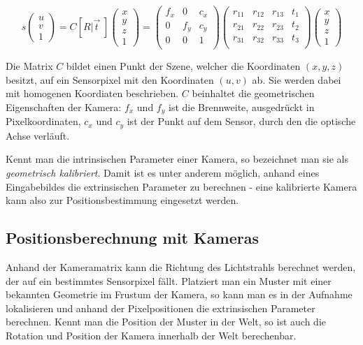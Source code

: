    \begin{equation}
     s \begin{pmatrix}  u \\ v \\ 1 \end{pmatrix} =  C[R|\vec{t}\;]	 
     \begin{pmatrix}  x \\ y \\ z \\ 1  \end{pmatrix} = 
     \begin{pmatrix}  
         f_x & 0 & c_x \\ 
         0  & f_y & c_y \\ 
         0  & 0 & 1 \\ 
     \end{pmatrix}
     \begin{pmatrix}  
         r_{11} & r_{12} & r_{13} & t_1 \\ 
         r_{21} & r_{22} & r_{23} & t_2 \\ 
         r_{31} & r_{32} & r_{33} & t_3 \\ 
     \end{pmatrix}
     \begin{pmatrix}  x \\ y \\ z \\ 1  \end{pmatrix}
     \label{eq:pinhole}
   \end{equation}

   Die Matrix $C$ bildet einen Punkt der Szene, welcher die Koordinaten $(x,y,z)$ besitzt, auf ein Sensorpixel mit den Koordinaten $(u,v)$ ab. Sie werden dabei mit homogenen Koordiaten beschrieben.
   $C$ beinhaltet die geometrischen Eigenschaften der Kamera: $f_x$ und $f_y$ ist die Brennweite, ausgedrückt in Pixelkoordinaten, $c_x$ und $c_y$ ist der Punkt auf dem Sensor, durch den die optische Achse verläuft.
   
   Kennt man die intrinsischen Parameter einer Kamera, so bezeichnet man sie als \emph{geometrisch kalibriert}. 
   Damit ist es unter anderem möglich, anhand eines Eingabebildes die extrinsischen Parameter zu berechnen - eine kalibrierte Kamera kann also zur Positionsbestimmung eingesetzt werden.
   
 \subsection{Positionsberechnung mit Kameras} \label{pos_kameras}
   Anhand der Kameramatrix kann die Richtung des Lichtstrahls berechnet werden, der auf ein bestimmtes Sensorpixel fällt.
   Platziert man ein Muster mit einer bekannten Geometrie im Frustum der Kamera, so kann man es in der Aufnahme lokalisieren und anhand der Pixelpositionen die extrinsischen Parameter berechnen. 
   Kennt man die Position der Muster in der Welt, so ist auch die Rotation und Position der Kamera innerhalb der Welt berechenbar.


